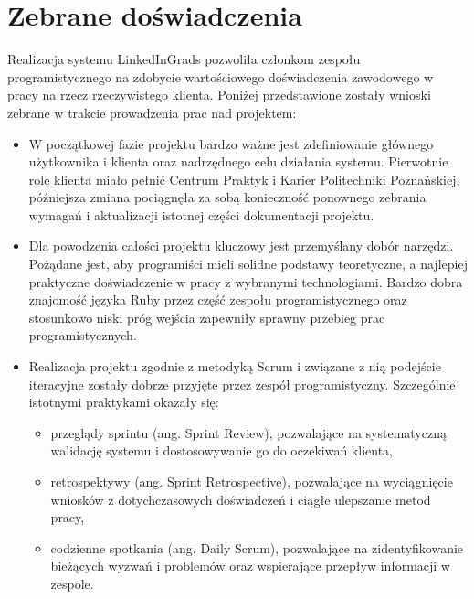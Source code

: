 \chapter{Zebrane doświadczenia}
\label{Chapter8}

Realizacja systemu LinkedInGrads pozwoliła członkom zespołu programistycznego na zdobycie wartościowego doświadczenia zawodowego w pracy na rzecz rzeczywistego klienta. Poniżej przedstawione zostały wnioski zebrane w trakcie prowadzenia prac nad projektem:

\begin{itemize}
\item W początkowej fazie projektu bardzo ważne jest zdefiniowanie głównego użytkownika i klienta oraz nadrzędnego celu działania systemu. Pierwotnie rolę klienta miało pełnić Centrum Praktyk i Karier Politechniki Poznańskiej, późniejsza zmiana pociągnęła za sobą konieczność ponownego zebrania wymagań i aktualizacji istotnej części dokumentacji projektu.
\item Dla powodzenia całości projektu kluczowy jest przemyślany dobór narzędzi. Pożądane jest, aby programiści mieli solidne podstawy teoretyczne, a najlepiej praktyczne doświadczenie w pracy z wybranymi technologiami. Bardzo dobra znajomość języka Ruby przez część zespołu programistycznego oraz stosunkowo niski próg wejścia zapewniły sprawny przebieg prac programistycznych.
\item Realizacja projektu zgodnie z metodyką Scrum i związane z nią podejście iteracyjne zostały dobrze przyjęte przez zespół programistyczny. Szczególnie istotnymi praktykami okazały się:

	\begin{itemize}
	\item przeglądy sprintu (ang. Sprint Review), pozwalające na 	systematyczną walidację systemu i dostosowywanie go do oczekiwań 	klienta,
	\item retrospektywy (ang. Sprint Retrospective), pozwalające na wyciągnięcie wniosków z dotychczasowych doświadczeń i ciągłe ulepszanie metod pracy,
	\item codzienne spotkania (ang. Daily Scrum), pozwalające na zidentyfikowanie bieżących wyzwań i problemów oraz wspierające przepływ informacji w zespole.
	\end{itemize}


\end{itemize}
